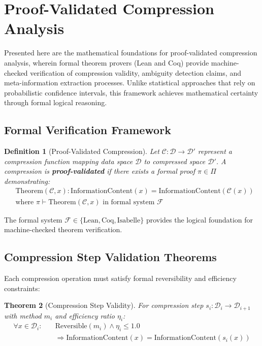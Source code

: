 \documentclass[11pt,a4paper]{article}
\newtheorem{theorem}{Theorem}[section]
\newtheorem{definition}[theorem]{Definition}
\begin{document}
\section{Proof-Validated Compression Analysis}
\label{sec:proof-validation-compression}

Presented here are the mathematical foundations for proof-validated compression analysis, wherein formal theorem provers (Lean and Coq) provide machine-checked verification of compression validity, ambiguity detection claims, and meta-information extraction processes. Unlike statistical approaches that rely on probabilistic confidence intervals, this framework achieves mathematical certainty through formal logical reasoning.

\subsection{Formal Verification Framework}

\begin{definition}[Proof-Validated Compression]
Let $\mathcal{C}: \mathcal{D} \to \mathcal{D}'$ represent a compression function mapping data space $\mathcal{D}$ to compressed space $\mathcal{D}'$. A compression is \textbf{proof-validated} if there exists a formal proof $\pi \in \Pi$ demonstrating:
\begin{align}
&\text{Theorem}(\mathcal{C}, x): \text{InformationContent}(x) = \text{InformationContent}(\mathcal{C}(x)) \label{eq:info-preservation}\\
&\text{where } \pi \vdash \text{Theorem}(\mathcal{C}, x) \text{ in formal system } \mathcal{F}
\end{align}
\end{definition}

The formal system $\mathcal{F} \in \{\text{Lean}, \text{Coq}, \text{Isabelle}\}$ provides the logical foundation for machine-checked theorem verification.

\subsection{Compression Step Validation Theorems}

Each compression operation must satisfy formal reversibility and efficiency constraints:

\begin{theorem}[Compression Step Validity]
For compression step $s_i: \mathcal{D}_i \to \mathcal{D}_{i+1}$ with method $m_i$ and efficiency ratio $\eta_i$:
\begin{align}
\forall x \in \mathcal{D}_i: \quad &\text{Reversible}(m_i) \land \eta_i \leq 1.0 \label{eq:compression-validity}\\
&\Rightarrow \text{InformationContent}(x) = \text{InformationContent}(s_i(x))
\end{align}
\end{theorem}
\end{document}
